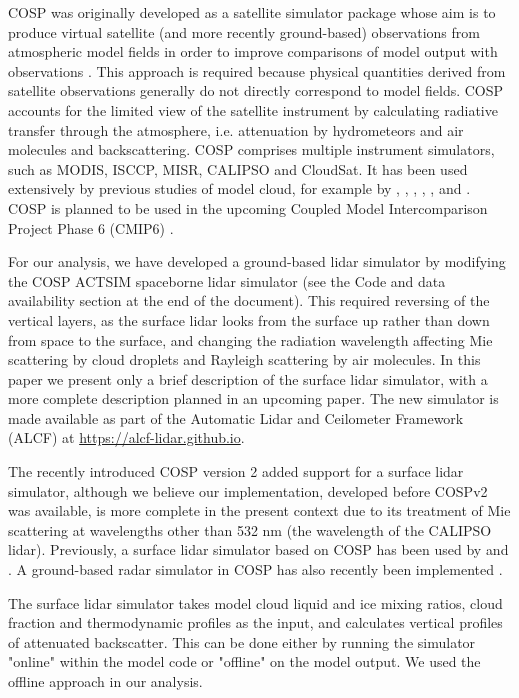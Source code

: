 COSP was originally developed as a satellite simulator package whose aim is to
produce virtual satellite (and more recently ground-based) observations from
atmospheric model fields in order to improve comparisons of model output with
observations \citep{bodas-salcedo2011}. This approach is required because
physical quantities derived from satellite observations generally do not
directly correspond to model fields. COSP accounts for the limited view of the
satellite instrument by calculating radiative transfer through the atmosphere,
i.e. attenuation by hydrometeors and air molecules and backscattering. COSP
comprises multiple instrument simulators, such as MODIS, ISCCP, MISR, CALIPSO
and CloudSat. It has been used extensively by previous studies of model cloud,
for example by \cite{kay2012}, \cite{franklin2013}, \cite{klein2013},
\cite{williams2017}, \cite{jin2017} , and \cite{schuddeboom2018}. COSP is
planned to be used in the upcoming Coupled Model Intercomparison Project Phase 6
(CMIP6) \citep{webb2017}.

For our analysis, we have developed a ground-based lidar simulator by modifying
the COSP ACTSIM spaceborne lidar simulator \citep{chiriaco2006} (see
the Code and data availability section at the end of the document). This
required reversing of the vertical layers, as the surface lidar looks from the
surface up rather than down from space to the surface, and changing the
radiation wavelength affecting Mie scattering by cloud droplets and Rayleigh
scattering by air molecules. In this paper we present only a brief description
of the surface lidar simulator, with a more complete description planned in an
upcoming paper. The new simulator is made available as part of the Automatic
Lidar and Ceilometer Framework (ALCF) at \url{https://alcf-lidar.github.io}.

The recently introduced COSP version 2 \citep{swales2018} added support for a
surface lidar simulator, although we believe our implementation, developed
before COSPv2 was available, is more complete in the present context due to its
treatment of Mie scattering at wavelengths other than 532 nm (the wavelength of
the CALIPSO lidar). Previously, a surface lidar simulator based on COSP has
been used by \cite{chiriaco2018} and \cite{bastin2018}. A ground-based radar
simulator in COSP has also recently been implemented \citep{zhang2018}. 

The surface lidar simulator takes model cloud liquid and ice mixing ratios,
cloud fraction and thermodynamic profiles as the input, and calculates vertical
profiles of attenuated backscatter. This can be done either by running the
simulator "online" within the model code or "offline" on the model output.
We used the offline approach in our analysis.

